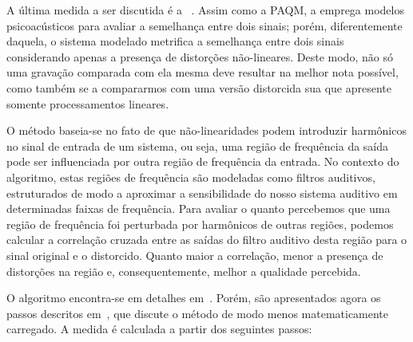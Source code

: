 A última medida a ser discutida é a \rnonlin{}~\cite{tan-2004}. Assim como a PAQM, a
\rnonlin{} emprega modelos psicoacústicos para avaliar a semelhança entre dois sinais;
porém, diferentemente daquela, o sistema modelado metrifica a semelhança entre dois
sinais considerando apenas a presença de distorções não-lineares. Deste modo, não só
uma gravação comparada com ela mesma deve resultar na melhor nota possível, como também
se a compararmos com uma versão distorcida sua que apresente somente processamentos
lineares.

O método baseia-se no fato de que não-linearidades podem introduzir harmônicos no sinal
de entrada de um sistema, ou seja, uma região de frequência da saída pode ser
influenciada por outra região de frequência da entrada. No contexto do algoritmo, estas
regiões de frequência são modeladas como filtros auditivos, estruturados de modo a
aproximar a sensibilidade do nosso sistema auditivo em determinadas faixas de
frequência. Para avaliar o quanto percebemos que uma região de frequência foi
perturbada por harmônicos de outras regiões, podemos calcular a correlação cruzada
entre as saídas do filtro auditivo desta região para o sinal original e o distorcido.
Quanto maior a correlação, menor a presença de distorções na região e,
consequentemente, melhor a qualidade percebida.

O algoritmo encontra-se em detalhes em~\cite{tan-2004}. Porém, são apresentados agora
os passos descritos em~\cite{moore-2004}, que discute o método de modo menos
matematicamente carregado. A medida é calculada a partir dos seguintes passos:

